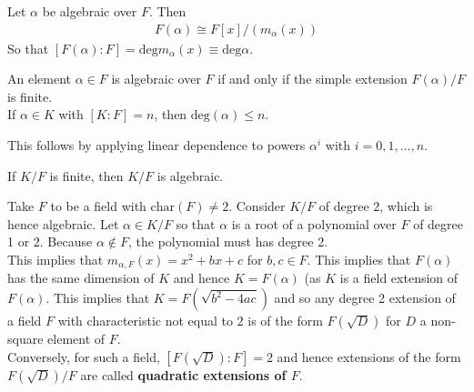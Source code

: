 \documentclass{memoir}
\begin{document}
\begin{prop}
	Let \(\alpha \) be algebraic over \(F\). Then
	\begin{align*}
		F(\alpha ) \cong F[x] / (m_{\alpha }(x))
	\end{align*}
	So that \([F(\alpha ):F] = \textrm{deg}m_{\alpha }(x) \equiv \textrm{deg}\alpha\).
\end{prop}

\begin{prop}
	An element \(\alpha  \in F\) is algebraic over \(F\) if and only if the simple extension \(F(\alpha ) / F\) is finite.\\

	If \(\alpha \in K\) with \([K:F] = n\), then \(\textrm{deg}(\alpha) \leq n\).
\end{prop}
This follows by applying linear dependence to powers \(\alpha^i\) with \(i = 0,1,\ldots,n\).
\begin{cor}
	If \(K / F\) is finite, then \(K / F\) is algebraic.
\end{cor}

\begin{exmp}
	Take \(F\) to be a field with \(\textrm{char}(F) \neq 2\). Consider \(K/F\) of degree 2, which is hence algebraic. Let \(\alpha  \in K / F\) so that \(\alpha \) is a root of a polynomial over \(F\) of degree 1 or 2. Because \(\alpha \not\in F\), the polynomial must has degree 2.\\

	This implies that \(m_{\alpha ,F}(x) = x^2+bx+c\) for \(b,c \in F\). This implies that \(F(\alpha )\) has the same dimension of \(K\) and hence \(K = F(\alpha )\) (as \(K\) is a field extension of \(F(\alpha )\). This implies that \(K = F(\sqrt{b^2-4ac} )\) and so any degree 2 extension of a field \(F\) with characteristic not equal to \(2\) is of the form \(F(\sqrt{D} )\) for \(D\) a non-square element of \(F\).\\

	Conversely, for such a field, \([F(\sqrt{D} ) : F] = 2\) and hence extensions of the form \(F(\sqrt{D} ) / F\) are called \textbf{quadratic extensions of \(F\)}.
\end{exmp}
\end{document}
